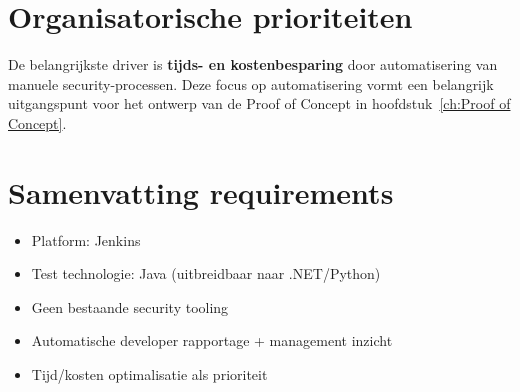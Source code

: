 \section{Organisatorische prioriteiten}

De belangrijkste driver is \textbf{tijds- en kostenbesparing} door automatisering van manuele security-processen. Deze focus op automatisering vormt een belangrijk uitgangspunt voor het ontwerp van de Proof of Concept in hoofdstuk~\ref{ch:Proof of Concept}.

\section{Samenvatting requirements}

\begin{itemize}
    \item Platform: Jenkins
    \item Test technologie: Java (uitbreidbaar naar .NET/Python)  
    \item Geen bestaande security tooling
    \item Automatische developer rapportage + management inzicht
    \item Tijd/kosten optimalisatie als prioriteit
\end{itemize}
